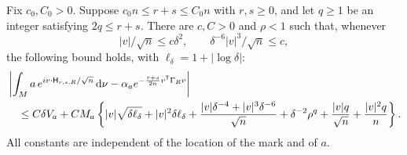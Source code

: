 \begin{lemma}
\label{lem:marked-spectral}
Fix $c_0,C_0>0$. Suppose $c_0n\le r+s\le C_0n$ with $r,s\ge0$,
and let $q\ge1$ be an integer satisfying $2q\le r+s$. There are
$c,C>0$ and $\rho<1$ such that, whenever
\[
 |v|/\sqrt n\le c\delta^2,\qquad
 \delta^{-6}|v|^3/\sqrt n\le c,
\]
the following bound holds, with $\ell_\delta=1+|\log\delta|$:
\begin{align}
 &\left|\int_M a\,e^{iv\cdot\mathsf H_{r,s,R}/\sqrt n}\,\mathrm d\nu
      -\alpha_a e^{-\frac{r+s}{2n}v^{\mathsf T}\Gamma_Rv}\right|
       \notag\\
 &\quad\le C\delta V_a+C M_a\left\{
 |v|\sqrt{\delta\ell_\delta}+|v|^2\delta\ell_\delta
 +\frac{|v|\delta^{-4}+|v|^3\delta^{-6}}{\sqrt n}
 +\delta^{-2}\rho^q+\frac{|v|q}{\sqrt n}
 +\frac{|v|^2q}{n}\right\}.
       \label{eq:marked-spectral-bound}
\end{align}
All constants are independent of the location of the mark and of $a$.
\end{lemma}
